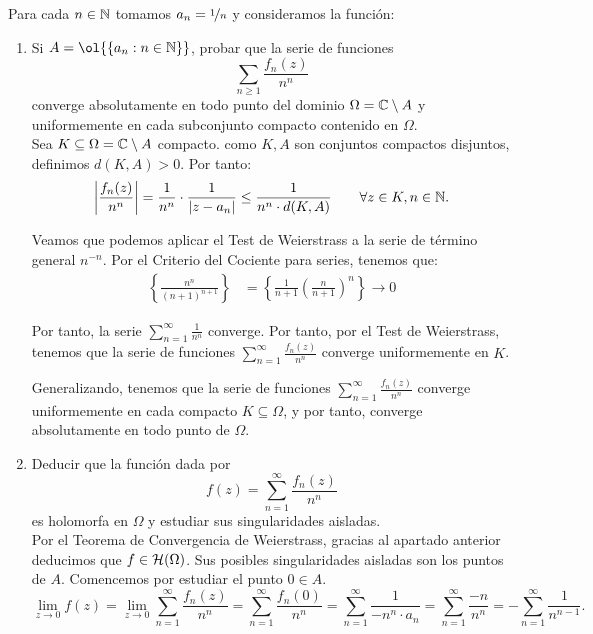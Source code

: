 \documentclass[12pt]{article}
\begin{document}
    \begin{ejercicio}[2.5 puntos]
        Para cada $n \in \mathbb{N}$ tomamos $a_n = \nicefrac{1}{n}$ y consideramos la función:
        \begin{enumerate}
            \item Si $A = \ol{\{a_n : n \in \bb{N}\}}$, probar que la serie de funciones
            \[
                \sum_{n \geq 1} \frac{f_n(z)}{n^n}
            \]
            converge absolutamente en todo punto del dominio $\Omega = \mathbb{C}\setminus A$ y uniformemente en cada subconjunto compacto contenido en $\Omega$.\\

            Sea $K \subseteq \Omega=\mathbb{C}\setminus A$ compacto. como $K,A$ son conjuntos compactos disjuntos, definimos $d(K,A)>0$. Por tanto:
            \begin{equation*}
                \left|\dfrac{f_n(z)}{n^n}\right| = \frac{1}{n^n}\cdot \dfrac{1}{|z - a_n|} \leq \frac{1}{n^n\cdot d(K,A)}\qquad \forall z\in K, n\in \mathbb{N}.
            \end{equation*}

            Veamos que podemos aplicar el Test de Weierstrass a la serie de término general $n^{-n}$. Por el Criterio del Cociente para series, tenemos que:
            \begin{align*}
                \left\{\frac{n^n}{{(n+1)}^{n+1}}\right\} &= \left\{\frac{1}{n+1}\left(\frac{n}{n+1}\right)^n\right\}\to 0
            \end{align*}

            Por tanto, la serie $\sum\limits_{n=1}^{\infty} \frac{1}{n^n}$ converge. Por tanto, por el Test de Weierstrass, tenemos que la serie de funciones $\sum\limits_{n=1}^{\infty} \frac{f_n(z)}{n^n}$ converge uniformemente en $K$.

            Generalizando, tenemos que la serie de funciones $\sum\limits_{n=1}^{\infty} \frac{f_n(z)}{n^n}$ converge uniformemente en cada compacto $K\subseteq \Omega$, y por tanto, converge absolutamente en todo punto de $\Omega$.


            \item Deducir que la función dada por
            \[
                f(z) = \sum_{n=1}^{\infty} \frac{f_n(z)}{n^n}
            \]
            es holomorfa en $\Omega$ y estudiar sus singularidades aisladas.\\

            Por el Teorema de Convergencia de Weierstrass, gracias al apartado anterior deducimos que $f\in \mathcal{H}(\Omega)$. Sus posibles singularidades aisladas son los puntos de $A$. Comencemos por estudiar el punto $0\in A$.
            \begin{equation*}
                \lim_{z\to 0} f(z) = \lim_{z\to 0} \sum_{n=1}^{\infty} \frac{f_n(z)}{n^n} = \sum_{n=1}^{\infty} \frac{f_n(0)}{n^n} = \sum_{n=1}^{\infty} \dfrac{1}{ - n^n\cdot a_n} = \sum_{n=1}^{\infty} \dfrac{-n}{n^{n}} = -\sum_{n=1}^{\infty} \dfrac{1}{n^{n-1}}.
            \end{equation*}


\end{enumerate}
\end{ejercicio}
\end{document}
